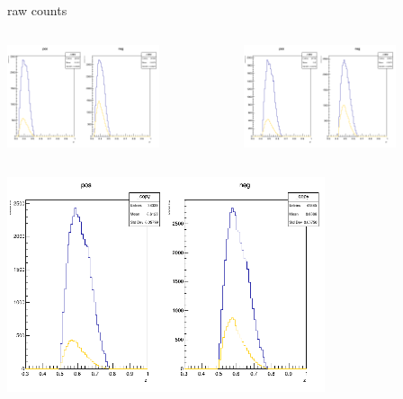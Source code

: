\begin{frame}{raw counts}
\begin{columns}
\begin{column}[T]{0.5\textwidth}
\includegraphics[width = 0.7\textwidth]{results/yield/statistics/counts_x_Q2_z_0.50_5.000_0.40.png}
\end{column}
\begin{column}[T]{0.5\textwidth}
\includegraphics[width = 0.7\textwidth]{results/yield/statistics/counts_x_Q2_z_0.50_5.000_0.50.png}
\end{column}
\end{columns}
\begin{columns}
\begin{column}[T]{0.5\textwidth}
\includegraphics[width = 0.7\textwidth]{results/yield/statistics/counts_x_Q2_z_0.50_5.000_0.60.png}

\end{column}
\end{columns}
\end{frame}
